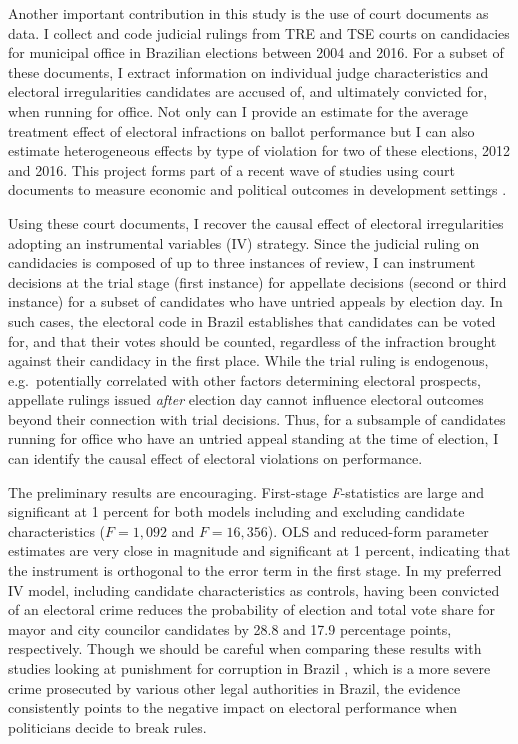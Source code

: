 \documentclass[11pt]{article}
\begin{document}
Another important contribution in this study is the use of court documents as data. I collect and code judicial rulings from TRE and TSE courts on candidacies for municipal office in Brazilian elections between 2004 and 2016. For a subset of these documents, I extract information on individual judge characteristics and electoral irregularities candidates are accused of, and ultimately convicted for, when running for office. Not only can I provide an estimate for the average treatment effect of electoral infractions on ballot performance but I can also estimate heterogeneous effects by type of violation for two of these elections, 2012 and 2016. This project forms part of a recent wave of studies using court documents to measure economic and political outcomes in development settings \citep{Sanchez-MartinezDismantlingInstitutionsCourt2018,LambaisJudicialSubversionEvidence2018}.

Using these court documents, I recover the causal effect of electoral irregularities adopting an instrumental variables (IV) strategy. Since the judicial ruling on candidacies is composed of up to three instances of review, I can instrument decisions at the trial stage (first instance) for appellate decisions (second or third instance) for a subset of candidates who have untried appeals by election day. In such cases, the electoral code in Brazil establishes that candidates can be voted for, and that their votes should be counted, regardless of the infraction brought against their candidacy in the first place. While the trial ruling is endogenous, e.g.~potentially correlated with other factors determining electoral prospects, appellate rulings issued \emph{after} election day cannot influence electoral outcomes beyond their connection with trial decisions. Thus, for a subsample of candidates running for office who have an untried appeal standing at the time of election, I can identify the causal effect of electoral violations on performance.

The preliminary results are encouraging. First-stage \emph{F}-statistics are large and significant at 1 percent for both models including and excluding candidate characteristics ($F = 1{,}092$ and $F = 16{,}356$). OLS and reduced-form parameter estimates are very close in magnitude and significant at 1 percent, indicating that the instrument is orthogonal to the error term in the first stage. In my preferred IV model, including candidate characteristics as controls, having been convicted of an electoral crime reduces the probability of election and total vote share for mayor and city councilor candidates by 28.8 and 17.9 percentage points, respectively. Though we should be careful when comparing these results with studies looking at punishment for corruption in Brazil \citep{FerrazExposingCorruptPoliticians2008b,FerrazElectoralAccountabilityCorruption2011a,WintersLackingInformationCondoning2013}, which is a more severe crime prosecuted by various other legal authorities in Brazil, the evidence consistently points to the negative impact on electoral performance when politicians decide to break rules.
\end{document}
